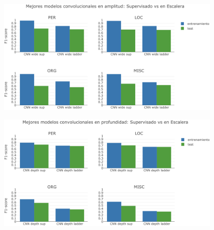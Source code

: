 \begin{figure}[H]
\begin{center}
\includegraphics[width=.9\linewidth]{images/CNN_wide_supervised_ladder_F1-score.png}
\caption{}
\label{fig:CNN_wide_supervised_ladder_F1-score}
\end{center}
\end{figure}


\begin{figure}[H]
\begin{center}
\includegraphics[width=.9\linewidth]{images/CNN_depth_supervised_ladder_F1-score.png}
\caption{}
\label{fig:CNN_depth_supervised_ladder_F1-score}
\end{center}
\end{figure}